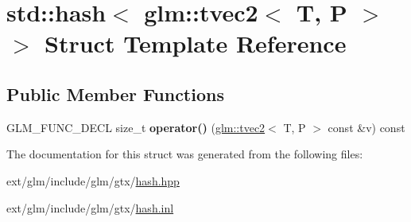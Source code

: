 \hypertarget{structstd_1_1hash_3_01glm_1_1tvec2_3_01_t_00_01_p_01_4_01_4}{\section{std\-:\-:hash$<$ glm\-:\-:tvec2$<$ T, P $>$ $>$ Struct Template Reference}
\label{structstd_1_1hash_3_01glm_1_1tvec2_3_01_t_00_01_p_01_4_01_4}
}
\subsection*{Public Member Functions}
\begin{DoxyCompactItemize}
\item 
\hypertarget{structstd_1_1hash_3_01glm_1_1tvec2_3_01_t_00_01_p_01_4_01_4_a5f5943c0c2acaeca105e77fbaa572461}{G\-L\-M\-\_\-\-F\-U\-N\-C\-\_\-\-D\-E\-C\-L size\-\_\-t {\bfseries operator()} (\hyperlink{structglm_1_1tvec2}{glm\-::tvec2}$<$ T, P $>$ const \&v) const }\label{structstd_1_1hash_3_01glm_1_1tvec2_3_01_t_00_01_p_01_4_01_4_a5f5943c0c2acaeca105e77fbaa572461}

\end{DoxyCompactItemize}


The documentation for this struct was generated from the following files\-:\begin{DoxyCompactItemize}
\item 
ext/glm/include/glm/gtx/\hyperlink{hash_8hpp}{hash.\-hpp}\item 
ext/glm/include/glm/gtx/\hyperlink{hash_8inl}{hash.\-inl}\end{DoxyCompactItemize}
